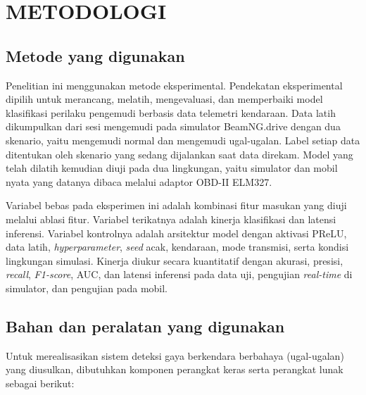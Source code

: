 \chapter{METODOLOGI}

\section{Metode yang digunakan}
Penelitian ini menggunakan metode eksperimental. Pendekatan eksperimental dipilih untuk merancang, melatih, mengevaluasi, dan memperbaiki model klasifikasi perilaku pengemudi berbasis data telemetri kendaraan. Data latih dikumpulkan dari sesi mengemudi pada simulator BeamNG.drive dengan dua skenario, yaitu mengemudi normal dan mengemudi ugal-ugalan. Label setiap data ditentukan oleh skenario yang sedang dijalankan saat data direkam. Model yang telah dilatih kemudian diuji pada dua lingkungan, yaitu simulator dan mobil nyata yang datanya dibaca melalui adaptor OBD-II ELM327.

Variabel bebas pada eksperimen ini adalah kombinasi fitur masukan yang diuji melalui ablasi fitur. Variabel terikatnya adalah kinerja klasifikasi dan latensi inferensi. Variabel kontrolnya adalah arsitektur model dengan aktivasi PReLU, data latih, \textit{hyperparameter}, \textit{seed} acak, kendaraan, mode transmisi, serta kondisi lingkungan simulasi. Kinerja diukur secara kuantitatif dengan akurasi, presisi, \textit{recall}, \textit{F1-score}, AUC, dan latensi inferensi pada data uji, pengujian \textit{real-time} di simulator, dan pengujian pada mobil.

\section{Bahan dan peralatan yang digunakan}
Untuk merealisasikan sistem deteksi gaya berkendara berbahaya (ugal-ugalan) yang diusulkan, dibutuhkan komponen perangkat keras serta perangkat lunak sebagai berikut:

